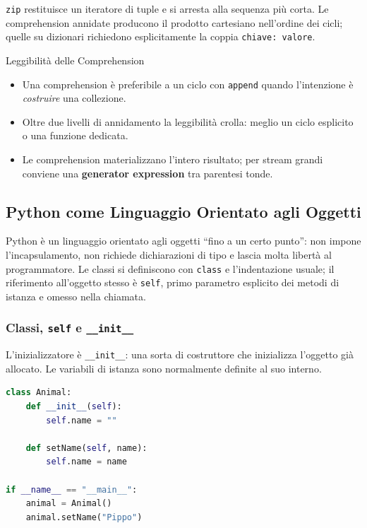 \documentclass[12pt]{extarticle}
\begin{document}
\noindent \texttt{zip} restituisce un iteratore di tuple e si arresta alla sequenza più corta. Le comprehension annidate producono il prodotto cartesiano nell'ordine dei cicli; quelle su dizionari richiedono esplicitamente la coppia \texttt{chiave: valore}.

\begin{cbox}{Leggibilità delle Comprehension}
\begin{itemize}
    \item Una comprehension è preferibile a un ciclo con \texttt{append} quando l'intenzione è \emph{costruire} una collezione.
    \item Oltre due livelli di annidamento la leggibilità crolla: meglio un ciclo esplicito o una funzione dedicata.
    \item Le comprehension materializzano l'intero risultato; per stream grandi conviene una \textbf{generator expression} tra parentesi tonde.
\end{itemize}
\end{cbox}

\subsection{Python come Linguaggio Orientato agli Oggetti}

\noindent Python è un linguaggio orientato agli oggetti ``fino a un certo punto'': non impone l'incapsulamento, non richiede dichiarazioni di tipo e lascia molta libertà al programmatore. Le classi si definiscono con \texttt{class} e l'indentazione usuale; il riferimento all'oggetto stesso è \texttt{self}, primo parametro esplicito dei metodi di istanza e omesso nella chiamata.

\subsubsection{Classi, \texttt{self} e \texttt{\_\_init\_\_}}

\noindent L'inizializzatore è \texttt{\_\_init\_\_}: una sorta di costruttore che inizializza l'oggetto già allocato. Le variabili di istanza sono normalmente definite al suo interno.

\begin{lstlisting}[language=Python]
class Animal:
    def __init__(self):
        self.name = ""

    def setName(self, name):
        self.name = name

if __name__ == "__main__":
    animal = Animal()
    animal.setName("Pippo")
\end{lstlisting}
\end{document}
